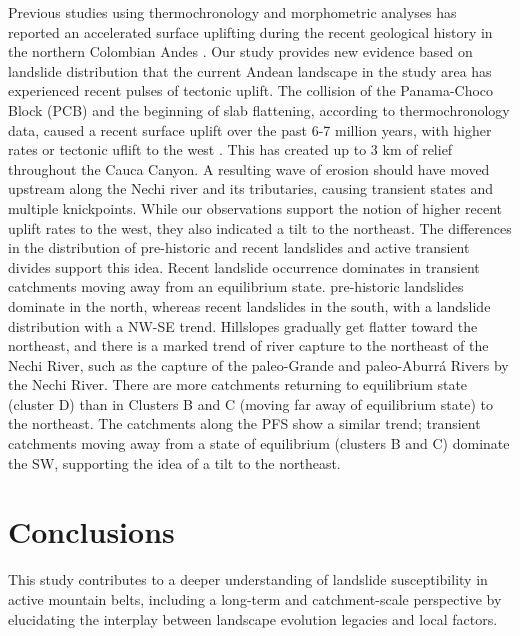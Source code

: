 \documentclass[draft]{agujournal2019}
\begin{document}
\par Previous studies using thermochronology and morphometric analyses has reported an accelerated surface uplifting during the recent geological history in the northern Colombian Andes \cite{restrepo2019, Noriega2020, perez2021, perez2022, ott2023}. Our study provides new evidence based on landslide distribution that the current Andean landscape in the study area has experienced recent pulses of tectonic uplift. The collision of the Panama-Choco Block (PCB) and the beginning of slab flattening, according to thermochronology data, caused a recent surface uplift over the past 6-7 million years, with higher rates or tectonic uflift to the west \cite{perez2021, ott2023}. This has created up to 3 km of relief throughout the Cauca Canyon. A resulting wave of erosion should have moved upstream along the Nechi river and its tributaries, causing transient states and multiple knickpoints. While our observations support the notion of higher recent uplift rates to the west, they also indicated a tilt to the northeast. The differences in the distribution of pre-historic and recent landslides and active transient divides support this idea. Recent landslide occurrence dominates in transient catchments moving away from an equilibrium state. pre-historic landslides dominate in the north, whereas recent landslides in the south, with a landslide distribution with a NW-SE trend. Hillslopes gradually get flatter toward the northeast, and there is a marked trend of river capture to the northeast of the Nechi River, such as the capture of the paleo-Grande and paleo-Aburrá Rivers by the Nechi River. There are more catchments returning to equilibrium state (cluster D) than in Clusters B and C (moving far away of equilibrium state) to the northeast. The catchments along the PFS show a similar trend; transient catchments moving away from a state of equilibrium (clusters B and C) dominate the SW, supporting the idea of a tilt to the northeast. 

\section{Conclusions}

\par This study contributes to a deeper understanding of landslide susceptibility in active mountain belts, including a long-term and catchment-scale perspective by elucidating the interplay between landscape evolution legacies and local factors. 
\end{document}
